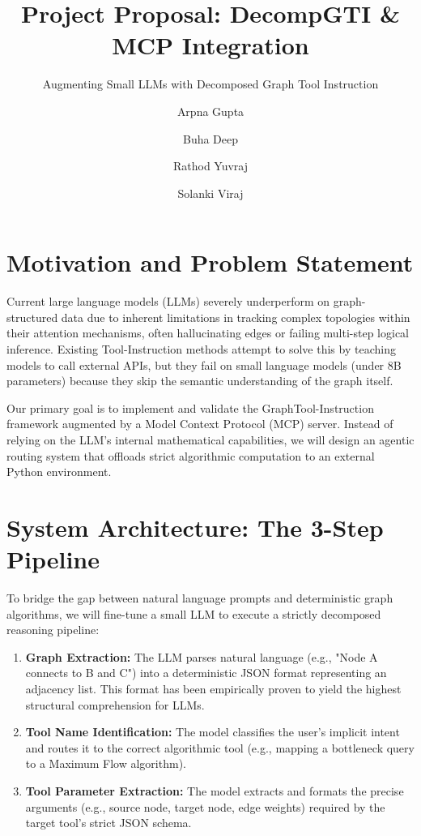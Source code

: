 \documentclass[sigconf, nonacm]{acmart}
\title{Project Proposal: DecompGTI \& MCP Integration}
\subtitle{Augmenting Small LLMs with Decomposed Graph Tool Instruction}
\author{Arpna Gupta}
\affiliation{%
  \institution{IIT Gandhinagar}
}
\author{Buha Deep}
\affiliation{%
  \institution{IIT Gandhinagar}
}
\author{Rathod Yuvraj}
\affiliation{%
  \institution{IIT Gandhinagar}
}
\author{Solanki Viraj}
\affiliation{%
  \institution{IIT Gandhinagar}
}
\begin{document}
\maketitle

\section{Motivation and Problem Statement}
Current large language models (LLMs) severely underperform on graph-structured data due to inherent limitations in tracking complex topologies within their attention mechanisms, often hallucinating edges or failing multi-step logical inference. Existing Tool-Instruction methods attempt to solve this by teaching models to call external APIs, but they fail on small language models (under 8B parameters) because they skip the semantic understanding of the graph itself. 

\noindent Our primary goal is to implement and validate the GraphTool-Instruction framework augmented by a Model Context Protocol (MCP) server. Instead of relying on the LLM's internal mathematical capabilities, we will design an agentic routing system that offloads strict algorithmic computation to an external Python environment. 

\section{System Architecture: The 3-Step Pipeline}
To bridge the gap between natural language prompts and deterministic graph algorithms, we will fine-tune a small LLM to execute a strictly decomposed reasoning pipeline:
\begin{enumerate}
    \item \textbf{Graph Extraction:} The LLM parses natural language (e.g., "Node A connects to B and C") into a deterministic JSON format representing an adjacency list. This format has been empirically proven to yield the highest structural comprehension for LLMs.
    \item \textbf{Tool Name Identification:} The model classifies the user's implicit intent and routes it to the correct algorithmic tool (e.g., mapping a bottleneck query to a Maximum Flow algorithm).
    \item \textbf{Tool Parameter Extraction:} The model extracts and formats the precise arguments (e.g., source node, target node, edge weights) required by the target tool's strict JSON schema.
\end{enumerate}
\end{document}
